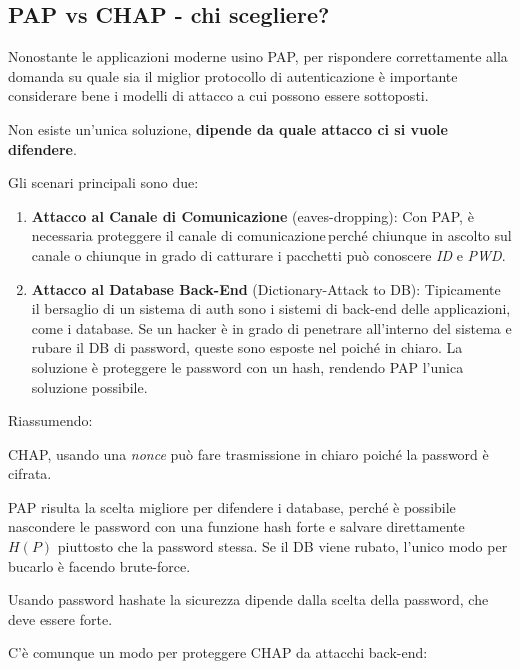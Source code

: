 \subsection{PAP vs CHAP - chi scegliere?}
Nonostante le applicazioni moderne usino PAP, per rispondere correttamente alla domanda su quale sia il miglior protocollo di autenticazione è importante considerare bene i modelli di attacco a cui possono essere sottoposti. 
\begin{theorem}
Non esiste un'unica soluzione, \textbf{dipende da quale attacco ci si vuole difendere}.
\end{theorem}
Gli scenari principali sono due:
\begin{enumerate}
    \item \textbf{Attacco al Canale di Comunicazione} (eaves-dropping): Con PAP, è necessaria proteggere il canale di comunicazione\footnotemark \,perché chiunque in ascolto sul canale o chiunque in grado di catturare i pacchetti può conoscere \textit{ID} e \textit{PWD}.  
    \item \textbf{Attacco al Database Back-End} (Dictionary-Attack to DB): Tipicamente il bersaglio di un sistema di auth sono i sistemi di back-end delle applicazioni, come i database. Se un hacker è in grado di penetrare all'interno del sistema e rubare il DB di password, queste sono esposte nel poiché in chiaro. La soluzione è proteggere le password con un hash, rendendo PAP l'unica soluzione possibile.
\end{enumerate}
Riassumendo: 
\begin{proposition}
CHAP, usando una \textit{nonce} può fare trasmissione in chiaro poiché la password è cifrata.
\end{proposition}
\begin{proposition}
PAP risulta la scelta migliore per difendere i database, perché è possibile nascondere le password con una funzione hash forte e salvare direttamente $H(P)$ piuttosto che la password stessa. Se il DB viene rubato, l'unico modo per bucarlo è facendo brute-force.
\end{proposition}
\begin{note}
Usando password hashate la sicurezza dipende dalla scelta della password, che deve essere forte. 
\end{note}
C'è comunque un modo per proteggere CHAP da attacchi back-end:
